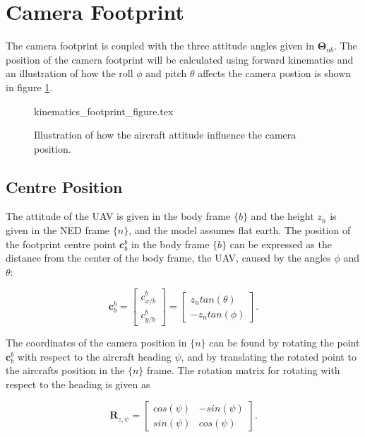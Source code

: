 \section{Camera Footprint}

The camera footprint is coupled with the three attitude angles given in $\bm{\Theta}_{nb}$. The position of the camera footprint will be calculated using forward kinematics and an illustration of how the roll $\phi$ and pitch $\theta$ affects the camera postion is shown in figure \ref{fig:footprint_centre}.

\begin{figure}
	{kinematics_footprint_figure.tex}
	\caption{Illustration of how the aircraft attitude influence the camera position.}
	\label{fig:footprint_centre}
\end{figure}

\subsection{Centre Position}

The attitude of the UAV is given in the body frame $\{b\}$ and the height $z_n$ is given in the NED frame $\{n\}$, and the model assumes flat earth. The position of the footprint centre point $\mathbf{c}_b^b$ in the body frame $\{b\}$ can be expressed as the distance from the center of the body frame, the UAV, caused by the angles $\phi$ and $\theta$:

\begin{equation}
	\label{eq:camera_position_body}
	\mathbf{c}_b^b =
	\begin{bmatrix}
		c_{x/b}^b \\ c_{y/b}^b
	\end{bmatrix}
	=
	\begin{bmatrix}
		z_n tan(\theta) \\ -z_n tan(\phi)
	\end{bmatrix}.
\end{equation}

The coordinates of the camera position in $\{n\}$ can be found by rotating the point $\mathbf{c}_b^b$ with respect to the aircraft heading $\psi$, and by translating the rotated point to the aircrafts position in the $\{n\}$ frame. The rotation matrix for rotating with respect to the heading is given as

\begin{equation}
	\mathbf{R}_{z,\psi} =
	\begin{bmatrix}
		cos(\psi) & -sin(\psi) \\
		sin(\psi) & cos(\psi)
	\end{bmatrix}.
\end{equation}

